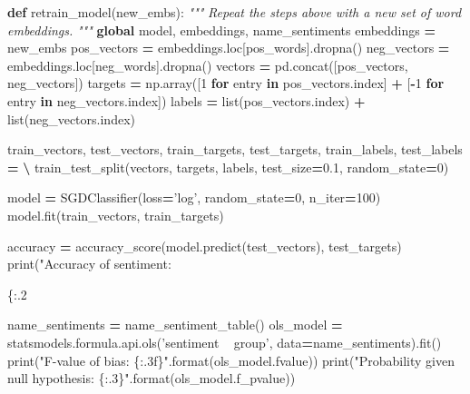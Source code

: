 \documentclass[]{book}
\newenvironment{Shaded}{\begin{snugshade}}{\end{snugshade}}
\newcommand{\KeywordTok}[1]{\textcolor[rgb]{0.13,0.29,0.53}{\textbf{#1}}}
\newcommand{\DecValTok}[1]{\textcolor[rgb]{0.00,0.00,0.81}{#1}}
\newcommand{\FloatTok}[1]{\textcolor[rgb]{0.00,0.00,0.81}{#1}}
\newcommand{\SpecialCharTok}[1]{\textcolor[rgb]{0.00,0.00,0.00}{#1}}
\newcommand{\StringTok}[1]{\textcolor[rgb]{0.31,0.60,0.02}{#1}}
\newcommand{\CommentTok}[1]{\textcolor[rgb]{0.56,0.35,0.01}{\textit{#1}}}
\newcommand{\ControlFlowTok}[1]{\textcolor[rgb]{0.13,0.29,0.53}{\textbf{#1}}}
\newcommand{\OperatorTok}[1]{\textcolor[rgb]{0.81,0.36,0.00}{\textbf{#1}}}
\newcommand{\BuiltInTok}[1]{#1}
\newcommand{\NormalTok}[1]{#1}
\theoremstyle{definition}
\theoremstyle{definition}
\theoremstyle{definition}
\theoremstyle{remark}
\begin{document}
\begin{Shaded}
\begin{Highlighting}[]
\KeywordTok{def}\NormalTok{ retrain_model(new_embs):}
    \CommentTok{"""}
\CommentTok{    Repeat the steps above with a new set of word embeddings.}
\CommentTok{    """}
    \KeywordTok{global}\NormalTok{ model, embeddings, name_sentiments}
\NormalTok{    embeddings }\OperatorTok{=}\NormalTok{ new_embs}
\NormalTok{    pos_vectors }\OperatorTok{=}\NormalTok{ embeddings.loc[pos_words].dropna()}
\NormalTok{    neg_vectors }\OperatorTok{=}\NormalTok{ embeddings.loc[neg_words].dropna()}
\NormalTok{    vectors }\OperatorTok{=}\NormalTok{ pd.concat([pos_vectors, neg_vectors])}
\NormalTok{    targets }\OperatorTok{=}\NormalTok{ np.array([}\DecValTok{1} \ControlFlowTok{for}\NormalTok{ entry }\KeywordTok{in}\NormalTok{ pos_vectors.index] }\OperatorTok{+}\NormalTok{ [}\OperatorTok{-}\DecValTok{1} \ControlFlowTok{for}\NormalTok{ entry }\KeywordTok{in}\NormalTok{ neg_vectors.index])}
\NormalTok{    labels }\OperatorTok{=} \BuiltInTok{list}\NormalTok{(pos_vectors.index) }\OperatorTok{+} \BuiltInTok{list}\NormalTok{(neg_vectors.index)}

\NormalTok{    train_vectors, test_vectors, train_targets, test_targets, train_labels, test_labels }\OperatorTok{=} \OperatorTok{\textbackslash{}}
\NormalTok{        train_test_split(vectors, targets, labels, test_size}\OperatorTok{=}\FloatTok{0.1}\NormalTok{, random_state}\OperatorTok{=}\DecValTok{0}\NormalTok{)}
        
\NormalTok{    model }\OperatorTok{=}\NormalTok{ SGDClassifier(loss}\OperatorTok{=}\StringTok{'log'}\NormalTok{, random_state}\OperatorTok{=}\DecValTok{0}\NormalTok{, n_iter}\OperatorTok{=}\DecValTok{100}\NormalTok{)}
\NormalTok{    model.fit(train_vectors, train_targets)}
    
\NormalTok{    accuracy }\OperatorTok{=}\NormalTok{ accuracy_score(model.predict(test_vectors), test_targets)}
    \BuiltInTok{print}\NormalTok{(}\StringTok{"Accuracy of sentiment: }\SpecialCharTok{\{:.2%
    
\NormalTok{    name_sentiments }\OperatorTok{=}\NormalTok{ name_sentiment_table()}
\NormalTok{    ols_model }\OperatorTok{=}\NormalTok{ statsmodels.formula.api.ols(}\StringTok{'sentiment ~ group'}\NormalTok{, data}\OperatorTok{=}\NormalTok{name_sentiments).fit()}
    \BuiltInTok{print}\NormalTok{(}\StringTok{"F-value of bias: }\SpecialCharTok{\{:.3f\}}\StringTok{"}\NormalTok{.}\BuiltInTok{format}\NormalTok{(ols_model.fvalue))}
    \BuiltInTok{print}\NormalTok{(}\StringTok{"Probability given null hypothesis: }\SpecialCharTok{\{:.3\}}\StringTok{"}\NormalTok{.}\BuiltInTok{format}\NormalTok{(ols_model.f_pvalue))}
    
}
\end{Highlighting}
\end{Shaded}
\end{document}
